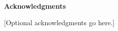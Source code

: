 
\clearpage
\begin{center}
\vspace*{5\baselineskip}
\textbf{\large Acknowledgments}
\end{center}

\begin{flushleft}
\hspace{10mm}[Optional acknowledgments go here.]
\end{flushleft}
\clearpage
